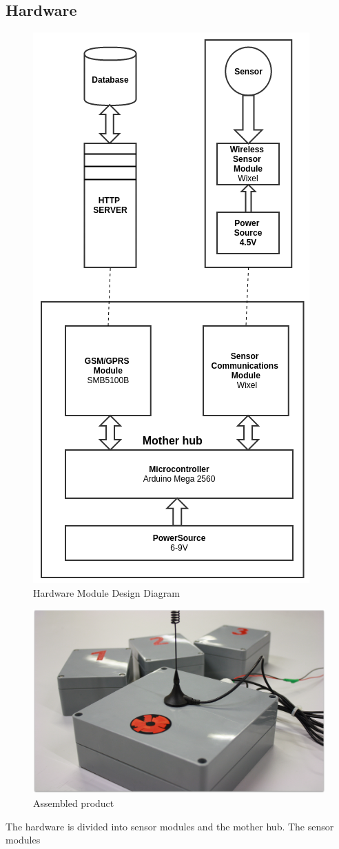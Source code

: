 \subsection{Hardware}
\begin{figure}
\centering
\includegraphics[width=0.5\linewidth]{graphics/HardwareMDD}
\caption{Hardware Module Design Diagram\label{fig:HardwareMDD}}
\end{figure}
\begin{figure}
\centering
\includegraphics[width=0.8\linewidth]{graphics/Our_product}
\caption{Assembled product\label{fig:Our_product}}
\end{figure}
The hardware is divided into sensor modules and the mother hub. The sensor modules 

